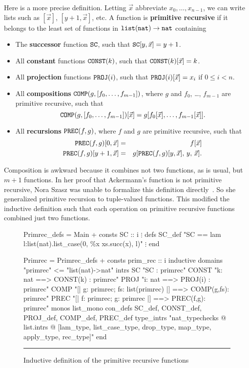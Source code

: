 \documentclass[12pt,a4paper]{article}
\newcommand\defn[1]{{\bf#1}}
\newcommand\nat{\hbox{\tt nat}}
\newcommand\lst{\hbox{\tt list}}
\newcommand\SC{\hbox{\tt SC}}
\newcommand\CONST{\hbox{\tt CONST}}
\newcommand\PROJ{\hbox{\tt PROJ}}
\newcommand\COMP{\hbox{\tt COMP}}
\newcommand\PREC{\hbox{\tt PREC}}
\begin{document}
Here is a more precise definition.  Letting $\vec{x}$ abbreviate
$x_0,\ldots,x_{n-1}$, we can write lists such as $[\vec{x}]$,
$[y+1,\vec{x}]$, etc.  A function is \defn{primitive recursive} if it
belongs to the least set of functions in $\lst(\nat)\to\nat$ containing
\begin{itemize}
\item The \defn{successor} function $\SC$, such that $\SC[y,\vec{x}]=y+1$.
\item All \defn{constant} functions $\CONST(k)$, such that
  $\CONST(k)[\vec{x}]=k$. 
\item All \defn{projection} functions $\PROJ(i)$, such that
  $\PROJ(i)[\vec{x}]=x_i$ if $0\leq i<n$. 
\item All \defn{compositions} $\COMP(g,[f_0,\ldots,f_{m-1}])$, 
where $g$ and $f_0$, \ldots, $f_{m-1}$ are primitive recursive,
such that
\[ \COMP(g,[f_0,\ldots,f_{m-1}])[\vec{x}] = 
   g[f_0[\vec{x}],\ldots,f_{m-1}[\vec{x}]]. \] 

\item All \defn{recursions} $\PREC(f,g)$, where $f$ and $g$ are primitive
  recursive, such that
\begin{eqnarray*}
  \PREC(f,g)[0,\vec{x}] & = & f[\vec{x}] \\
  \PREC(f,g)[y+1,\vec{x}] & = & g[\PREC(f,g)[y,\vec{x}],\, y,\, \vec{x}].
\end{eqnarray*} 
\end{itemize}
Composition is awkward because it combines not two functions, as is usual,
but $m+1$ functions.  In her proof that Ackermann's function is not
primitive recursive, Nora Szasz was unable to formalize this definition
directly~\cite{szasz93}.  So she generalized primitive recursion to
tuple-valued functions.  This modified the inductive definition such that
each operation on primitive recursive functions combined just two functions.

\begin{figure}
\begin{ttbox}
Primrec_defs = Main +
consts SC :: i
 \(\vdots\)
defs
 SC_def    "SC == lam l:list(nat).list_case(0, \%x xs.succ(x), l)"
 \(\vdots\)
end

Primrec = Primrec_defs +
consts prim_rec :: i
inductive
 domains "primrec" <= "list(nat)->nat"
 intrs
   SC     "SC : primrec"
   CONST  "k: nat ==> CONST(k) : primrec"
   PROJ   "i: nat ==> PROJ(i) : primrec"
   COMP   "[| g: primrec; fs: list(primrec) |] ==> COMP(g,fs): primrec"
   PREC   "[| f: primrec; g: primrec |] ==> PREC(f,g): primrec"
 monos       list_mono
 con_defs    SC_def, CONST_def, PROJ_def, COMP_def, PREC_def
 type_intrs "nat_typechecks @ list.intrs @                      
             [lam_type, list_case_type, drop_type, map_type,    
              apply_type, rec_type]"
end
\end{ttbox}
\hrule
\caption{Inductive definition of the primitive recursive functions} 
\label{primrec-fig}
\end{figure}
\def\fs{{\it fs}} 
\end{document}
